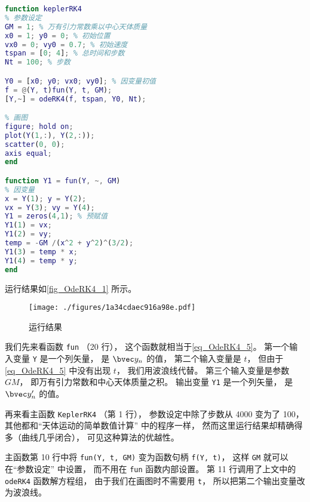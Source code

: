 \begin{lstlisting}[language=matlab, caption=keplerRK4.m]
function keplerRK4
% 参数设定
GM = 1; % 万有引力常数乘以中心天体质量
x0 = 1; y0 = 0; % 初始位置
vx0 = 0; vy0 = 0.7; % 初始速度
tspan = [0; 4]; % 总时间和步数
Nt = 100; % 步数

Y0 = [x0; y0; vx0; vy0]; % 因变量初值
f = @(Y, t)fun(Y, t, GM);
[Y,~] = odeRK4(f, tspan, Y0, Nt);

% 画图
figure; hold on;
plot(Y(1,:), Y(2,:));
scatter(0, 0);
axis equal;
end

function Y1 = fun(Y, ~, GM)
% 因变量
x = Y(1); y = Y(2);
vx = Y(3); vy = Y(4);
Y1 = zeros(4,1); % 预赋值
Y1(1) = vx;
Y1(2) = vy;
temp = -GM /(x^2 + y^2)^(3/2);
Y1(3) = temp * x;
Y1(4) = temp * y;
end
\end{lstlisting}

运行结果如\autoref{fig_OdeRK4_1} 所示。

\begin{figure}[ht]
\centering
\texttt{[image: ./figures/1a34cdaec916a98e.pdf]}
\caption{运行结果} \label{fig_OdeRK4_1}
\end{figure}

我们先来看函数 \verb|fun| （20 行）， 这个函数就相当于\autoref{eq_OdeRK4_5}。 第一个输入变量 \verb|Y| 是一个列矢量， 是 $\bvec y_n$ 的值， 第二个输入变量是 $t$， 但由于\autoref{eq_OdeRK4_5} 中没有出现 $t$， 我们用波浪线代替。 第三个输入变量是参数 $GM$， 即万有引力常数和中心天体质量之积。 输出变量 \verb|Y1| 是一个列矢量， 是 $\bvec y'_n$ 的值。

再来看主函数 \verb|KeplerRK4| （第 1 行）， 参数设定中除了步数从 4000 变为了 100， 其他都和“天体运动的简单数值计算” 中的程序一样， 然而这里运行结果却精确得多（曲线几乎闭合）， 可见这种算法的优越性。

主函数第 10 行中将 \verb|fun(Y, t, GM)| 变为函数句柄 \verb|f(Y, t)|， 这样 \verb|GM| 就可以在“参数设定” 中设置， 而不用在 \verb|fun| 函数内部设置。 第 11 行调用了上文中的 \verb|odeRK4| 函数解方程组， 由于我们在画图时不需要用 \verb|t|， 所以把第二个输出变量改为波浪线。
